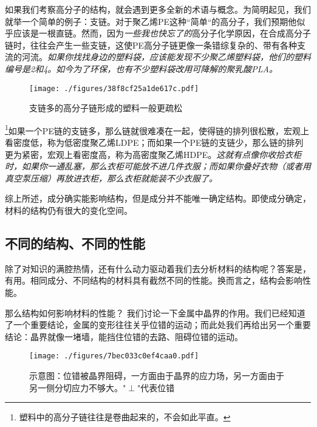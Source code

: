 如果我们考察高分子的结构，就会遇到更多全新的术语与概念。为简明起见，我们就举一个简单的例子：支链。对于聚乙烯PE这种“简单“的高分子，我们预期他似乎应该是一根直链。然而，因为\textsl{一些我也快忘了的}高分子化学原因，在合成高分子链时，往往会产生一些支链，这使PE高分子链更像一条错综复杂的、带有各种支流的河流。\textsl{如果你找找身边的塑料袋，应该能发现不少聚乙烯塑料袋，他们的塑料编号是2和4。如今为了环保，也有不少塑料袋改用可降解的聚乳酸PLA。}
\begin{figure}[ht]
\centering
\texttt{[image: ./figures/38f8cf25a1de617c.pdf]}
\caption{支链多的高分子链形成的塑料一般更疏松} \label{fig_MSEINT_4}
\end{figure}
\footnote{塑料中的高分子链往往是卷曲起来的，不会如此平直。}如果一个PE链的支链多，那么链就很难凑在一起，使得链的排列很松散，宏观上看密度低，称为低密度聚乙烯LDPE；而如果一个PE链的支链少，那么链的排列更为紧密，宏观上看密度高，称为高密度聚乙烯HDPE。\textsl{这就有点像你收拾衣柜时，如果你一通乱塞，那么衣柜可能放不进几件衣服；而如果你叠好衣物（或者用真空泵压缩）再放进衣柜，那么衣柜就能装不少衣服了。}

综上所述，成分确实能影响结构，但是成分并不能唯一确定结构。即使成分确定，材料的结构仍有很大的变化空间。
 
\subsection{不同的结构、不同的性能}

除了对知识的满腔热情，还有什么动力驱动着我们去分析材料的结构呢？答案是，有用。相同成分、不同结构的材料具有截然不同的性能。换而言之，结构会影响性能。

那么结构如何影响材料的性能？
我们讨论一下金属中晶界的作用。我们已经知道了一个重要结论，金属的变形往往关乎位错的运动；而此处我们再给出另一个重要结论：晶界就像一堵墙，能挡住位错的去路、阻碍位错的运动。
\begin{figure}[ht]
\centering
\texttt{[image: ./figures/7bec033c0ef4caa0.pdf]}
\caption{示意图：位错被晶界阻碍，一方面由于晶界的应力场，另一方面由于另一侧分切应力不够大。"$\perp$"代表位错} \label{fig_MSEINT_6}
\end{figure}

